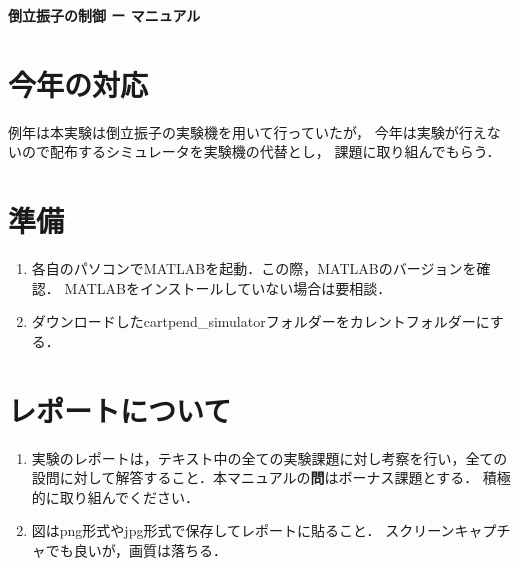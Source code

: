 \documentclass[a4,10pt]{article}
\begin{document}
\addtolength{\abovedisplayskip}{-.7mm}
\addtolength{\belowdisplayskip}{-.7mm}
\addtolength{\jot}{-.3mm}
\addtolength{\textfloatsep}{-2mm}
\addtolength{\floatsep}{2mm}
\addtolength{\baselineskip}{1.2mm}


\begin{center}
 \LARGE \bfseries
 倒立振子の制御 ー マニュアル
\end{center}



\section{今年の対応}
例年は本実験は倒立振子の実験機を用いて行っていたが，
今年は実験が行えないので配布するシミュレータを実験機の代替とし，
課題に取り組んでもらう． 

\section{準備}
\begin{enumerate}
    \item 各自のパソコンでMATLABを起動．この際，MATLABのバージョンを確認． 
    MATLABをインストールしていない場合は要相談．
    \item ダウンロードしたcartpend\_simulatorフォルダーをカレントフォルダーにする．
\end{enumerate}


\section{レポートについて}

\begin{enumerate}
    \item 実験のレポートは，テキスト中の全ての実験課題に対し考察を行い，全ての設問に対して解答すること．本マニュアルの\textbf{問}はボーナス課題とする．
    積極的に取り組んでください．
    \item 図はpng形式やjpg形式で保存してレポートに貼ること．
    スクリーンキャプチャでも良いが，画質は落ちる．
\end{enumerate}
\end{document}
